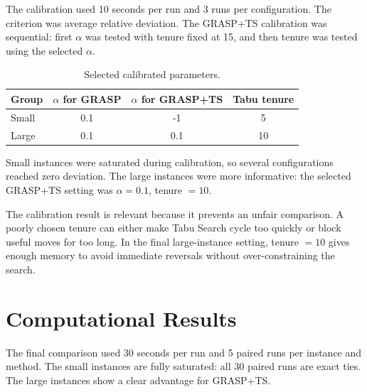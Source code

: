 \documentclass[12pt,a4paper]{article}
\newcommand{\grasp}{GRASP}
\newcommand{\graspTS}{GRASP+TS}
\newcommand{\tabu}{Tabu Search}
\begin{document}
The calibration used 10 seconds per run and 3 runs per configuration. The criterion was average relative deviation. The \graspTS{} calibration was sequential: first \(\alpha\) was tested with tenure fixed at 15, and then tenure was tested using the selected \(\alpha\).

\begin{table}[htbp]
\centering
\caption{Selected calibrated parameters.}
\begin{tabular}{lccc}
\toprule
Group & \(\alpha\) for \grasp{} & \(\alpha\) for \graspTS{} & Tabu tenure \\
\midrule
Small & 0.1 & -1 & 5 \\
Large & 0.1 & 0.1 & 10 \\
\bottomrule
\end{tabular}
\end{table}

Small instances were saturated during calibration, so several configurations reached zero deviation. The large instances were more informative: the selected \graspTS{} setting was \(\alpha=0.1\), tenure \(=10\).

The calibration result is relevant because it prevents an unfair comparison. A poorly chosen tenure can either make \tabu{} cycle too quickly or block useful moves for too long. In the final large-instance setting, tenure \(=10\) gives enough memory to avoid immediate reversals without over-constraining the search.

\section{Computational Results}

The final comparison used 30 seconds per run and 5 paired runs per instance and method. The small instances are fully saturated: all 30 paired runs are exact ties. The large instances show a clear advantage for \graspTS{}.
\end{document}

